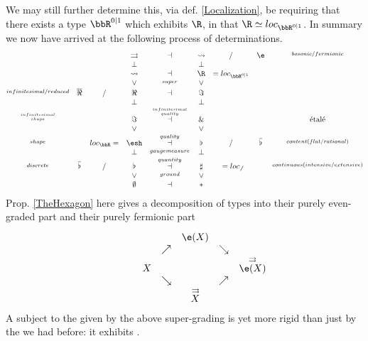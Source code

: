 We may still further determine this, via def. \ref{Localization}, be requiring that there exists a type $\bbR^{0|1}$ which exhibits $\R$, in that $\R \simeq loc_{\bbR^{0|1}}$.
In summary we now have arrived at the following process of determinations.
\begin{displaymath}
\itexarray{
&& & \rightrightarrows &\dashv& \rightsquigarrow & / & \e & \stackrel{bosonic/fermionic}{}
\\
&& & \bot && \bot
\\
&&  & \rightsquigarrow &\dashv& \R & = loc_{\bbR^{0|1}}
\\
&& & \vee &\stackrel{super}{}& \vee
\\
\stackrel{infinitesimal/reduced}{} &\overline{\Re} & / & \Re &\stackrel{}{\dashv}& \Im &  &  &
\\
&& & \bot && \bot
\\
\stackrel{infinitesimal \atop shape}{} && & \Im &\stackrel{infinitesimal \atop quality}{\dashv}& \& & && \text{étalé}
\\
&& & \vee && \vee
\\
\stackrel{shape}{} && loc_{\bbR} =& \esh  &\stackrel{quality}{\dashv}& \flat & / & \overline{\flat}&  \stackrel{content(flat/rational)}{}
\\
&& & \bot &\stackrel{gaugemeasure}{}& \bot
\\
\stackrel{discrete}{} & \overline{\flat} & / & \flat &\stackrel{quantity}{\dashv}& \sharp & = loc_{\not\not}  &   & \stackrel{continuous (intensive/extensive)}{}
\\
&& & \vee &\stackrel{ground}{}& \vee
\\
&& & \emptyset &\dashv& \ast &
}
\end{displaymath}
Prop. \ref{TheHexagon} here gives a decomposition of types into their purely even-graded part and their purely fermionic part
\begin{displaymath}
\itexarray{
&&   &&  && \stackrel{}{\e(X)}
\\
& & &  & & \nearrow_{} && \searrow
\\
&& && X && &&
\stackrel{\rightrightarrows}{\e(X)}
\\
&  &  &  & & \searrow && \nearrow_{}
\\
&&  &&  && \stackrel{\rightrightarrows}{X}
}
\end{displaymath}
A  subject to the  given by the above super-grading is yet more rigid than just by the  we had before: it exhibits .

